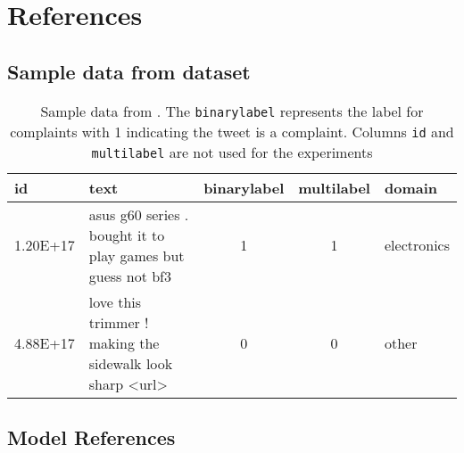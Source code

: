 \chapter{References}

\section{Sample data from dataset}
\begin{table}[ht]
    \captionsetup{font=small}
    \centering
    \begin{tabularx}{\textwidth}{|l|X|c|c|l|}
        \hline
        \rowcolor[gray]{0.7}
        \textbf{id} & \textbf{text}                                               & \textbf{binarylabel} & \textbf{multilabel} & \textbf{domain} \\
        \hline
        1.20E+17    & asus g60 series . bought it to play games but guess not bf3 & 1                    & 1                   & electronics     \\
        \hline
        4.88E+17    & love this trimmer ! making the sidewalk look sharp <url>    & 0                    & 0                   & other           \\
        \hline
    \end{tabularx}
    \caption{Sample data from \cite{jinModelingSeverityComplaints2021}. The \texttt{binarylabel} represents the label for complaints with 1 indicating the tweet is a complaint. Columns \texttt{id} and \texttt{multilabel} are not used for the experiments}
    \label{tab: apdx_sample_data}
\end{table}

\section{Model References}


